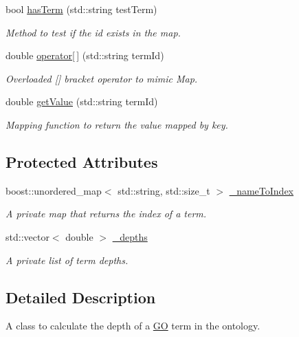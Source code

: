 \begin{DoxyCompactItemize}
bool \hyperlink{classTermDepthMap_a11f5ed887edd0b335ac64171ebecf3f3}{has\+Term} (std\+::string test\+Term)
\begin{DoxyCompactList}\small\item\em Method to test if the id exists in the map. \end{DoxyCompactList}\item 
double \hyperlink{classTermDepthMap_a687255e97647a9afc0a5f0197d0b05c9}{operator\mbox{[}$\,$\mbox{]}} (std\+::string term\+Id)
\begin{DoxyCompactList}\small\item\em Overloaded \mbox{[}\mbox{]} bracket operator to mimic Map. \end{DoxyCompactList}\item 
double \hyperlink{classTermDepthMap_af6ba97e619f7fe0a9e906c6eccfd98fa}{get\+Value} (std\+::string term\+Id)
\begin{DoxyCompactList}\small\item\em Mapping function to return the value mapped by key. \end{DoxyCompactList}\end{DoxyCompactItemize}
\subsection*{Protected Attributes}
\begin{DoxyCompactItemize}
\item 
boost\+::unordered\+\_\+map$<$ std\+::string, std\+::size\+\_\+t $>$ \hyperlink{classTermDepthMap_adf3435b02b709abc108fa8e18e0b73fa}{\+\_\+name\+To\+Index}
\begin{DoxyCompactList}\small\item\em A private map that returns the index of a term. \end{DoxyCompactList}\item 
std\+::vector$<$ double $>$ \hyperlink{classTermDepthMap_af1bc0c6d34c57061de60e771afd76f11}{\+\_\+depths}
\begin{DoxyCompactList}\small\item\em A private list of term depths. \end{DoxyCompactList}\end{DoxyCompactItemize}


\subsection{Detailed Description}
A class to calculate the depth of a \hyperlink{namespaceGO}{GO} term in the ontology. 

